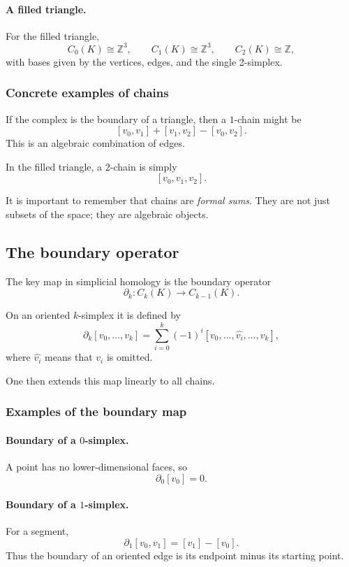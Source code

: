 \documentclass[12pt,a4paper]{article}
\theoremstyle{notespace}
\begin{document}
\paragraph{A filled triangle.}
For the filled triangle,
\[
C_0(K)\cong \mathbb{Z}^3,\qquad
C_1(K)\cong \mathbb{Z}^3,\qquad
C_2(K)\cong \mathbb{Z},
\]
with bases given by the vertices, edges, and the single 2-simplex.

\subsubsection{Concrete examples of chains}

If the complex is the boundary of a triangle, then a \(1\)-chain might be
\[
[v_0,v_1]+[v_1,v_2]-[v_0,v_2].
\]
This is an algebraic combination of edges.

In the filled triangle, a \(2\)-chain is simply
\[
[v_0,v_1,v_2].
\]

It is important to remember that chains are \emph{formal sums}. They are not just subsets of the space; they are algebraic objects.

\subsection{The boundary operator}

The key map in simplicial homology is the boundary operator
\[
\partial_k:C_k(K)\to C_{k-1}(K).
\]

On an oriented \(k\)-simplex it is defined by
\[
\partial_k[v_0,\dots,v_k]
=
\sum_{i=0}^k (-1)^i [v_0,\dots,\widehat{v_i},\dots,v_k],
\]
where \(\widehat{v_i}\) means that \(v_i\) is omitted.

One then extends this map linearly to all chains.

\subsubsection{Examples of the boundary map}

\paragraph{Boundary of a \(0\)-simplex.}
A point has no lower-dimensional faces, so
\[
\partial_0[v_0]=0.
\]

\paragraph{Boundary of a \(1\)-simplex.}
For a segment,
\[
\partial_1[v_0,v_1]
=
[v_1]-[v_0].
\]
Thus the boundary of an oriented edge is its endpoint minus its starting point.
\end{document}

